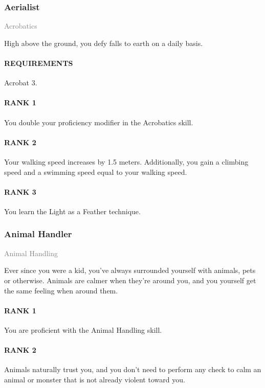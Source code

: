 \subsubsection{Aerialist} \label{feat::aerialist}
\small{\textcolor{gray}{Acrobatics}}

\normalsize
High above the ground, you defy falls to earth on a daily basis.
\paragraph{REQUIREMENTS} Acrobat 3.
\paragraph{RANK 1} You double your proficiency modifier in the Acrobatics skill.
\paragraph{RANK 2} Your walking speed increases by 1.5 meters.
Additionally, you gain a climbing speed and a swimming speed equal to your walking speed.
\paragraph{RANK 3} You learn the Light as a Feather technique.

\subsubsection{Animal Handler} \label{feat::animalhandler}
\small{\textcolor{gray}{Animal Handling}}

\normalsize
Ever since you were a kid, you've always surrounded yourself with animals, pets or otherwise.
Animals are calmer when they're around you, and you yourself get the same feeling when around them.
\paragraph{RANK 1} You are proficient with the Animal Handling skill.
\paragraph{RANK 2} Animals naturally trust you, and you don't need to perform any check to calm an animal or monster that is not already violent toward you.
